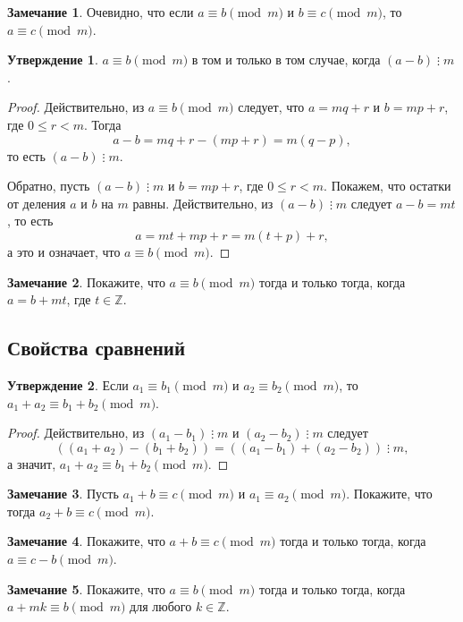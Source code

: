\documentclass[14pt, a4paper]{extarticle}
\theoremstyle{definition}
\newtheorem*{remark}{Замечание}
\newtheorem{statement}{Утверждение}
\newcommand{\divisible}{\mathop{\vdots}}
\begin{document}
	\begin{remark}
		Очевидно, что если $a\equiv b\pmod{m}$ и $b\equiv c\pmod{m}$, то $a\equiv c\pmod{m}$.
	\end{remark}

	\begin{statement}
		$a\equiv b\pmod{m}$ в том и только в том случае, когда $(a-b)\divisible m$.
	\end{statement}
	\begin{proof}
		Действительно, из $a\equiv b\pmod{m}$ следует, что \mbox{$a=mq+r$} и $b=mp+r$, где $0\leqslant r<m$. Тогда $$a-b=mq+r-(mp+r)=m(q-p),$$ то есть $(a-b)\divisible m$.
		
		Обратно, пусть $(a-b)\divisible m$ и $b=mp+r$, где $0\leqslant r<m$. Покажем, что остатки от деления $a$ и $b$ на $m$ равны. Действительно, из $(a-b)\divisible m$ следует $a-b=mt$, то есть $$a=mt+mp+r=m(t+p)+r,$$ а это и означает, что $a\equiv b\pmod{m}$.
	\end{proof}

	\begin{remark}
		Покажите, что $a\equiv b\pmod{m}$ тогда и только тогда, когда $a=b+mt$, где $t\in\mathbb{Z}$.
	\end{remark}

\subsection{Свойства сравнений}
\label{prop}

	\begin{statement}
		Если $a_1\equiv b_1\pmod{m}$ и $a_2\equiv b_2\pmod{m}$, то $a_1+a_2\equiv b_1+b_2\pmod{m}$.
	\end{statement}
	\begin{proof}
		Действительно, из $(a_1-b_1)\divisible m$ и $(a_2-b_2)\divisible m$ следует $$((a_1+a_2)-(b_1+b_2))=((a_1-b_1)+(a_2-b_2))\divisible m,$$ а значит, $a_1+a_2\equiv b_1+b_2\pmod{m}$.
	\end{proof}

	\begin{remark}
		Пусть $a_1+b\equiv c\pmod{m}$ и $a_1\equiv a_2\pmod{m}$. Покажите, что тогда $a_2+b\equiv c\pmod{m}$.
	\end{remark}

	\begin{remark}
		Покажите, что $a+b\equiv c\pmod{m}$ тогда и только тогда, когда $a\equiv c-b\pmod{m}$.
	\end{remark}

	\begin{remark}
		Покажите, что $a\equiv b\pmod{m}$ тогда и только тогда, когда $a+mk\equiv b\pmod{m}$ для любого $k\in\mathbb{Z}$.
	\end{remark}
\end{document}
